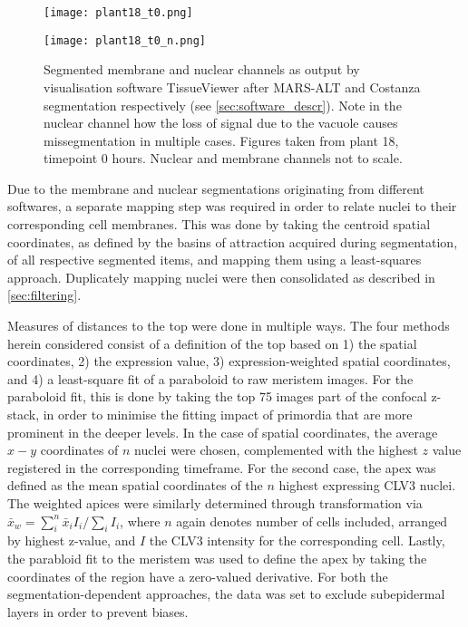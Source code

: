 \begin{figure}[H]
    \centering
    \begin{minipage}{0.49\textwidth}
        \centering
        \texttt{[image: plant18\_t0.png]}
      \end{minipage}\hfill
      \begin{minipage}{.49\textwidth}
        \centering
        \texttt{[image: plant18\_t0\_n.png]}
      \end{minipage}
      \caption[Segmented data]{Segmented membrane and nuclear channels as output by
        visualisation software TissueViewer after MARS-ALT and
        Costanza segmentation respectively (see \cref{sec:software_descr}). Note in the nuclear channel
        how the loss of signal due to the vacuole causes missegmentation in
        multiple cases. Figures taken from plant 18, timepoint 0 hours. Nuclear
        and membrane channels not to scale.}  
\end{figure}

Due to the membrane and nuclear segmentations originating from different
softwares, a separate mapping step was required in order to relate nuclei to
their corresponding cell membranes. This was done by taking the centroid spatial
coordinates, as defined by the basins of attraction acquired during
segmentation, of all respective segmented items, and mapping them using a
least-squares approach. Duplicately mapping nuclei were then
consolidated as described in \cref{sec:filtering}. 

Measures of distances to the top were done in multiple ways. The four methods
herein considered consist of a definition of the top based on 1) the spatial
coordinates, 2) the expression value, 3) expression-weighted spatial
coordinates, and 4) a least-square fit of a paraboloid to raw meristem images.
For the paraboloid fit, this is done by taking the top 75 images part of the
confocal z-stack, in order to minimise the fitting impact of primordia that
are more prominent in the deeper levels.
In the case of spatial coordinates, the average $x-y$  
coordinates of $n$ nuclei were chosen, complemented with the highest $z$ value
registered in the corresponding timeframe. For the second case, the apex was
defined as the mean spatial coordinates of the $n$ highest expressing CLV3
nuclei. The weighted apices were similarly determined through transformation via
$\bar{x}_{w} = \sum^{n}_{i} \bar{x}_{i}I_i / \sum_{i} I_i$, where $n$ again denotes number of cells included,
arranged by highest z-value, and $I$ the CLV3 intensity for the
corresponding cell.
Lastly, the parabloid fit to the meristem was used to define the apex by
taking the coordinates of the region have a zero-valued derivative. For both the
segmentation-dependent approaches, the data was set to exclude subepidermal
layers in order to prevent biases. 

